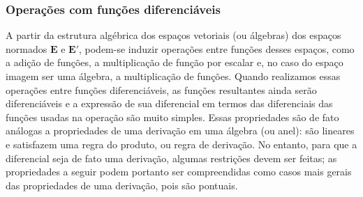 \subsubsection{Operações com funções diferenciáveis}

A partir da estrutura algébrica dos espaços vetoriais (ou álgebras) dos espaços normados $\bm E$ e $\bm E'$, podem-se induzir operações entre funções desses espaços, como a adição de funções, a multiplicação de função por escalar e, no caso do espaço imagem ser uma álgebra, a multiplicação de funções. Quando realizamos essas operações entre funções diferenciáveis, as funções resultantes ainda serão diferenciáveis e a expressão de sua diferencial em termos das diferenciais das funções usadas na operação são muito simples. Essas propriedades são de fato análogas a propriedades de uma derivação em uma álgebra (ou anel): são lineares e satisfazem uma regra do produto, ou regra de derivação. No entanto, para que a diferencial seja de fato uma derivação, algumas restrições devem ser feitas; as propriedades a seguir podem portanto ser compreendidas como casos mais gerais das propriedades de uma derivação, pois são pontuais.

